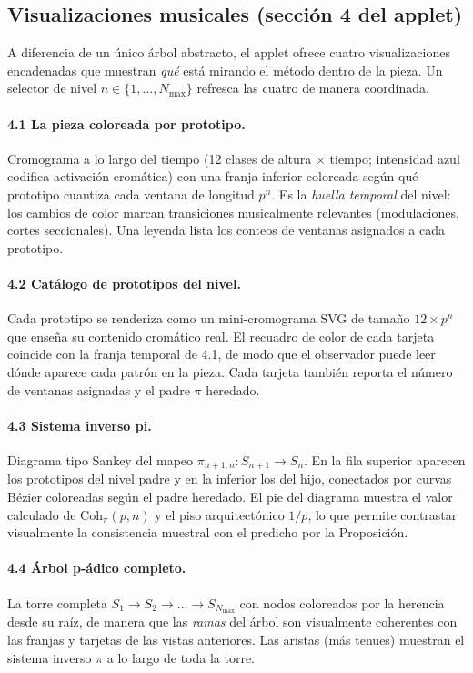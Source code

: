 \documentclass[11pt,a4paper,oneside]{article}
\theoremstyle{plain}
\theoremstyle{definition}
\theoremstyle{remark}
\newcommand{\Cohpi}{\mathrm{Coh}_\pi}
\begin{document}
\subsection{Visualizaciones musicales (sección 4 del applet)}

A diferencia de un único árbol abstracto, el applet ofrece cuatro
visualizaciones encadenadas que muestran \emph{qué} está mirando el
método dentro de la pieza. Un selector de nivel
$n \in \{1, \dots, N_{\max}\}$ refresca las cuatro de manera coordinada.

\paragraph{4.1 La pieza coloreada por prototipo.}
Cromograma a lo largo del tiempo (12 clases de altura $\times$ tiempo;
intensidad azul codifica activación cromática) con una franja inferior
coloreada según qué prototipo cuantiza cada ventana de longitud $p^n$.
Es la \emph{huella temporal} del nivel: los cambios de color marcan
transiciones musicalmente relevantes (modulaciones, cortes seccionales).
Una leyenda lista los conteos de ventanas asignados a cada prototipo.

\paragraph{4.2 Catálogo de prototipos del nivel.}
Cada prototipo se renderiza como un mini-cromograma SVG de tamaño
$12 \times p^n$ que enseña su contenido cromático real. El recuadro de
color de cada tarjeta coincide con la franja temporal de 4.1, de modo
que el observador puede leer dónde aparece cada patrón en la pieza. Cada
tarjeta también reporta el número de ventanas asignadas y el padre $\pi$
heredado.

\paragraph{4.3 Sistema inverso pi.}
Diagrama tipo Sankey del mapeo
$\pi_{n+1,n}: S_{n+1} \to S_n$. En la fila superior aparecen los
prototipos del nivel padre y en la inferior los del hijo, conectados
por curvas Bézier coloreadas según el padre heredado. El pie del
diagrama muestra el valor calculado de $\Cohpi(p,n)$ y el piso
arquitectónico $1/p$, lo que permite contrastar visualmente la
consistencia muestral con el predicho por la Proposición.

\paragraph{4.4 Árbol p-ádico completo.}
La torre completa $S_1 \to S_2 \to \dots \to S_{N_{\max}}$ con nodos
coloreados por la herencia desde su raíz, de manera que las
\emph{ramas} del árbol son visualmente coherentes con las franjas y
tarjetas de las vistas anteriores. Las aristas (más tenues) muestran el
sistema inverso $\pi$ a lo largo de toda la torre.
\end{document}
